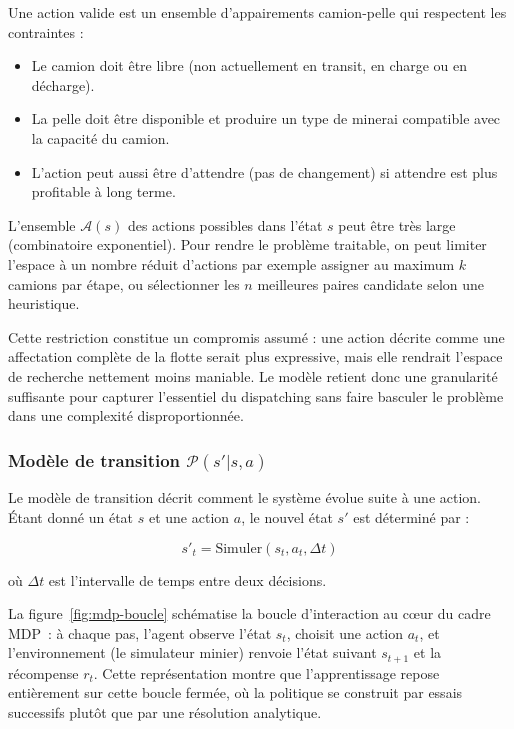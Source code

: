\documentclass[11pt,a4paper]{report}
\begin{document}
Une action valide est un ensemble d'appairements camion-pelle qui respectent les contraintes :
\begin{itemize}
    \item Le camion doit être libre (non actuellement en transit, en charge ou en décharge).
    \item La pelle doit être disponible et produire un type de minerai compatible avec la capacité du camion.
    \item L'action peut aussi être d'attendre (pas de changement) si attendre est plus profitable à long terme.
\end{itemize}

L'ensemble $\mathcal{A}(s)$ des actions possibles dans l'état $s$ peut être très large (combinatoire exponentiel). Pour rendre le problème traitable, on peut limiter l'espace à un nombre réduit d'actions par exemple assigner au maximum $k$ camions par étape, ou sélectionner les $n$ meilleures paires candidate selon une heuristique.

Cette restriction constitue un compromis assumé : une action décrite comme une affectation complète de la flotte serait plus expressive, mais elle rendrait l'espace de recherche nettement moins maniable. Le modèle retient donc une granularité suffisante pour capturer l'essentiel du dispatching sans faire basculer le problème dans une complexité disproportionnée.

\subsubsection*{Modèle de transition $\mathcal{P}(s' | s, a)$}

Le modèle de transition décrit comment le système évolue suite à une action. Étant donné un état $s$ et une action $a$, le nouvel état $s'$ est déterminé par :

\begin{equation}
    s'_t = \text{Simuler}(s_t, a_t, \Delta t)
\end{equation}

où $\Delta t$ est l'intervalle de temps entre deux décisions.

La figure~\ref{fig:mdp-boucle} sch\'ematise la boucle d'interaction au c\oe ur du cadre MDP~: \`a chaque pas, l'agent observe l'\'etat $s_t$, choisit une action $a_t$, et l'environnement (le simulateur minier) renvoie l'\'etat suivant $s_{t+1}$ et la r\'ecompense $r_t$. Cette repr\'esentation montre que l'apprentissage repose enti\`erement sur cette boucle ferm\'ee, o\`u la politique se construit par essais successifs plut\^ot que par une r\'esolution analytique.
\end{document}
